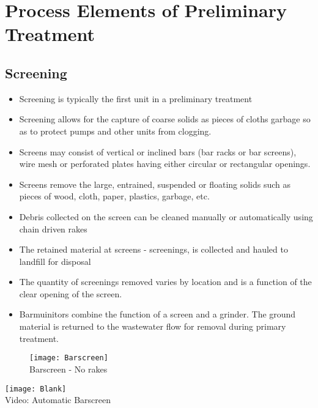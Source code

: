 				
		\section{Process Elements of Preliminary Treatment}	
			
		\subsection{Screening}
					\begin{itemize}
						\item Screening is typically the first unit in a preliminary treatment
						\item Screening allows for the capture of coarse solids as pieces of cloths garbage so as to protect pumps and other units from clogging. 
						\item Screens may consist of vertical or inclined bars (bar racks or bar screens), wire mesh or perforated plates having either circular or rectangular openings. 
						\item Screens remove the large, entrained, suspended or floating solids such as pieces of wood, cloth, paper, plastics, garbage, etc.
						\item Debris collected on the screen can be cleaned manually or automatically using chain driven rakes 
						\item The retained material at screens - screenings, is collected and hauled to landfill for disposal
						\item The quantity of screenings removed varies by location and is a function of the clear opening of the screen.
						\item Barmuinitors combine the function of a screen and a grinder.  The ground material is returned to the wastewater flow for removal during primary treatment.
					\end{itemize}

\begin{figure}
\begin{center}
    \texttt{[image: Barscreen]}\\

Barscreen - No rakes
\end{center}
  \end{figure}
  
 \begin{center}
    \texttt{[image: Blank]}\\
\hspace{0cm} Video: Automatic Barscreen
  \end{center}
 
